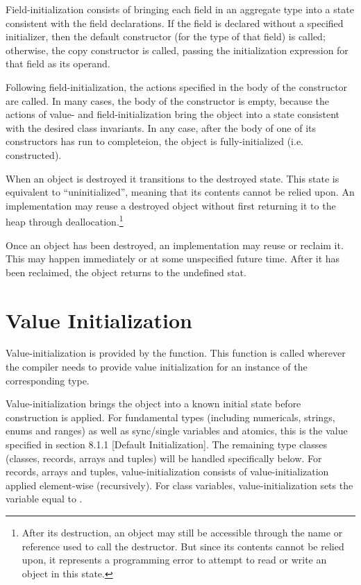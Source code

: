 Field-initialization consists of bringing each field in an aggregate type into a
state consistent with the field declarations.  If the field is declared without
a specified initializer, then the default constructor (for the type of that
field) is called; otherwise, the copy constructor is called, passing the
initialization expression for that field as its operand.

Following field-initialization, the actions specified in the body of the
constructor are called.  In many cases, the body of the constructor is empty,
because the actions of value- and field-initialization bring the object into a
state consistent with the desired class invariants.  In any case, after the body
of one of its constructors has run to completeion, the object is
fully-initialized (i.e. constructed).

When an object is destroyed it transitions to the destroyed state.  This state
is equivalent to ``uninitialized'', meaning that its contents cannot be relied
upon.  An implementation may reuse a destroyed object without first returning it
to the heap through deallocation.\footnote{After its destruction, an object may
  still be accessible through the name or reference used to call the
  destructor.  But since its contents cannot be relied upon, it represents a
  programming error to attempt to read or write an object in this state.}

Once an object has been destroyed, an implementation may reuse or reclaim it.
This may happen immediately or at some unspecified future time.  After it has
been reclaimed, the object returns to the undefined stat.

\section{Value Initialization}

Value-initialization is provided by the  function.
This function is called wherever the compiler needs to provide value initialization
for an instance of the corresponding type.  

Value-initialization brings the object into a known initial state before
construction is applied.  For fundamental types (including numericals, strings,
enums and ranges) as well as sync/single variables and atomics, this is the
value specified in section 8.1.1 [Default Initialization].  The remaining type
classes (classes, records, arrays and tuples) will be handled specifically below.
For records, arrays and tuples, value-initialization consists of
value-initialization applied element-wise (recursively).  For class variables,
value-initialization sets the variable equal to .

